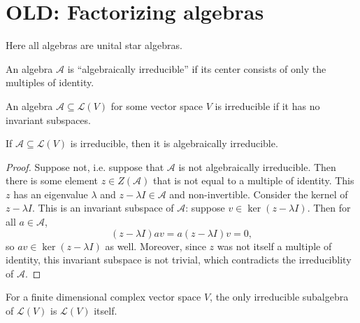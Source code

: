 \newpage
\appendix
\section{OLD: Factorizing algebras}

\newcommand{\calA}{\mathcal{A}}
\newcommand{\calL}{\mathcal{L}}

Here all algebras are unital star algebras. 

\begin{definition}
    An algebra $\mathcal{A}$ is ``algebraically irreducible'' if its center consists of only the multiples of identity.
\end{definition}
\begin{definition}
    An algebra $\mathcal{A} \subseteq \mathcal{L}(V)$ for some vector space $V$ is irreducible if it has no invariant subspaces.
\end{definition}
\begin{claim}
If $\calA \subseteq \calL(V)$ is irreducible, then it is algebraically irreducible.
\end{claim}
\begin{proof}
    Suppose not, i.e. suppose that $\calA$ is not algebraically irreducible. Then there is some element $z \in Z(\calA)$ that is not equal to a multiple of identity. This $z$ has an eigenvalue $\lambda$ and $z - \lambda I \in \calA$ and non-invertible. Consider the kernel of $z - \lambda I$. This is an invariant subspace of $\calA$: suppose $v \in \ker(z -\lambda I)$. Then for all $a \in \calA$,
    \[ (z - \lambda I) a v = a (z - \lambda I)v = 0,\]
    so $av \in \ker(z - \lambda I)$ as well. Moreover, since $z$ was not itself a multiple of identity, this invariant subspace is not trivial, which contradicts the irreduciblity of $\calA$.
\end{proof}

\begin{theorem}[Burnside]
For a finite dimensional complex vector space $V$, the only irreducible subalgebra of $\calL(V)$ is $\calL(V)$ itself.
\end{theorem}

